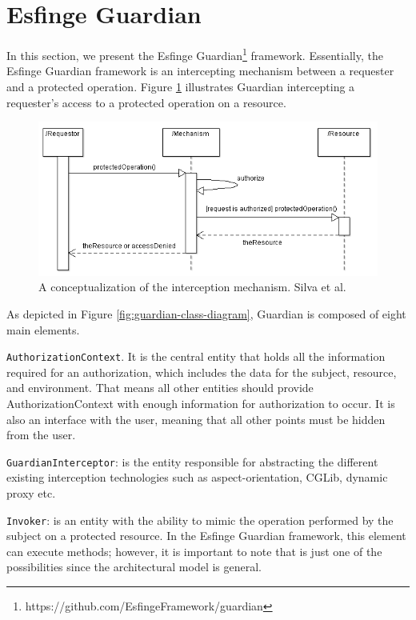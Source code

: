\documentclass[sigconf]{acmart}
\begin{document}
\section{Esfinge Guardian}
In this section, we present the Esfinge Guardian\footnote{https://github.com/EsfingeFramework/guardian} framework. Essentially, the Esfinge Guardian framework is an intercepting mechanism between a requester and a protected operation. Figure \ref{fig:interception-mechanism} illustrates Guardian intercepting a requester's access to a protected operation on a resource.

\begin{figure}
  \centering
  \includegraphics[scale=0.5]{img/interception-mechanism.png}
  \caption{A conceptualization of the interception mechanism. Silva et al. \cite{Silva2013}}
  \label{fig:interception-mechanism}
\end{figure}

As depicted in Figure \ref{fig:guardian-class-diagram}, Guardian is composed of eight main elements.

\noindent \verb|AuthorizationContext|. It is the central entity that holds all the information required for an authorization, which includes the data for the subject, resource, and environment. That means all other entities should provide AuthorizationContext with enough information for authorization to occur. It is also an interface with the user, meaning that all other points must be hidden from the user.

\noindent \verb|GuardianInterceptor|: is the entity responsible for abstracting the different existing interception technologies such as aspect-orientation, CGLib, dynamic proxy etc.


\noindent \verb|Invoker|: is an entity with the ability to mimic the operation performed by the subject on a protected resource. In the Esfinge Guardian framework, this element can execute methods; however, it is important to note that is just one of the possibilities since the architectural model is general.
\end{document}
